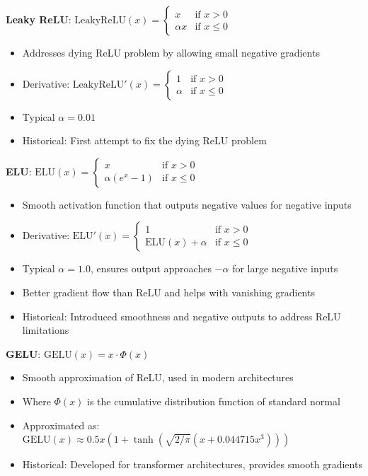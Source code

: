 \textbf{Leaky ReLU}: $\text{LeakyReLU}(x) = \begin{cases} x & \text{if } x > 0 \\ \alpha x & \text{if } x \leq 0 \end{cases}$
\begin{itemize}
	\item Addresses dying ReLU problem by allowing small negative gradients
	\item Derivative: $\text{LeakyReLU}'(x) = \begin{cases} 1 & \text{if } x > 0 \\ \alpha & \text{if } x \leq 0 \end{cases}$
	\item Typical $\alpha = 0.01$
	\item Historical: First attempt to fix the dying ReLU problem
\end{itemize}

\textbf{ELU}: $\text{ELU}(x) = \begin{cases} x & \text{if } x > 0 \\ \alpha(e^x - 1) & \text{if } x \leq 0 \end{cases}$
\begin{itemize}
	\item Smooth activation function that outputs negative values for negative inputs
	\item Derivative: $\text{ELU}'(x) = \begin{cases} 1 & \text{if } x > 0 \\ \text{ELU}(x) + \alpha & \text{if } x \leq 0 \end{cases}$
	\item Typical $\alpha = 1.0$, ensures output approaches $-\alpha$ for large negative inputs
	\item Better gradient flow than ReLU and helps with vanishing gradients
	\item Historical: Introduced smoothness and negative outputs to address ReLU limitations
\end{itemize}

\textbf{GELU}: $\text{GELU}(x) = x \cdot \Phi(x)$
\begin{itemize}
	\item Smooth approximation of ReLU, used in modern architectures
	\item Where $\Phi(x)$ is the cumulative distribution function of standard normal
	\item Approximated as: $\text{GELU}(x) \approx 0.5x(1 + \tanh(\sqrt{2/\pi}(x + 0.044715x^3)))$
	\item Historical: Developed for transformer architectures, provides smooth gradients
\end{itemize}

